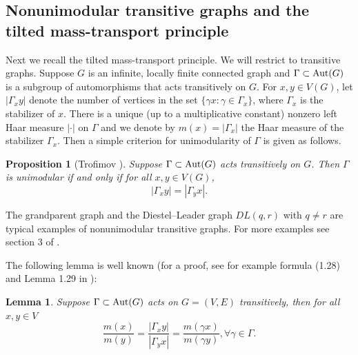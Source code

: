 \documentclass[12pt]{article}
\newtheorem{lemma}[theorem]{Lemma}
\newtheorem{proposition}[theorem]{Proposition}
\numberwithin{equation}{section}
\newcommand{\1}{\mathbf{1}}
\begin{document}
 
 
 
 
 
 
 
 
 
 
 
 
 
 
 
 
 
 
 
 
 
 
 
 
 \subsection{Nonunimodular transitive graphs and the tilted mass-transport principle}\label{sec: subsection 2.3}
 Next we recall the tilted mass-transport principle. We will restrict to transitive graphs.
 Suppose $G$ is an infinite, locally finite connected graph and $\Gamma\subset\textnormal{Aut}(G)$ is a subgroup of automorphisms that acts transitively on $G$. For $x,y\in V(G)$, let $|\Gamma_xy|$ denote the number of vertices in the set $\{\gamma x:\gamma\in \Gamma_x \}$, where $\Gamma_x$ is the stabilizer of $x$. There is a unique (up to a multiplicative constant) nonzero left Haar measure $|\cdot|$ on $\Gamma$ and we denote by $m(x)=|\Gamma_x|$ the Haar measure of the stabilizer $\Gamma_x$. Then a simple criterion for unimodularity of $\Gamma$ is given as follows. 
\begin{proposition}[Trofimov \cite{Trofimov1985}]\label{prop:unicre}
	Suppose $\Gamma\subset \textnormal{Aut}(G)$ acts transitively on $G$. Then $\Gamma$ is unimodular if and only if for all $x,y\in V(G
	)$,  
	\[
	|\Gamma_xy|=|\Gamma_yx|.
	\]
\end{proposition}

The grandparent graph and the Diestel--Leader graph $DL(q,r)$ with $q\neq r$ are typical examples of nonunimodular transitive graphs. For more examples see section 3 of \cite{Timar2006}.

The following lemma is well known (for a proof, see for example formula (1.28) and Lemma 1.29 in \cite{Woess2000} ):
\begin{lemma}\label{lem:haar}
	Suppose $\Gamma\subset \textnormal{Aut}(G)$ acts on $G=(V,E)$ transitively, then for all $x,y\in V$
	\[
	\frac{m(x)}{m(y)}=\frac{|\Gamma_xy|}{|\Gamma_yx|}=\frac{m(\gamma x)}{m(\gamma y)},\forall \gamma\in \Gamma.
	\]
	
\end{lemma}
\end{document}

